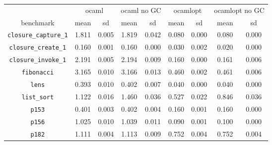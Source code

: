 \documentclass[12pt,a4paper,twoside,openright]{report}
\begin{document}
\begin{table}[h]
\begin{tabular}{| c | c c | c c | c c | c c |}
  \hline
  & \multicolumn{2}{c|}{ocaml}
  & \multicolumn{2}{c|}{ocaml no GC}
  & \multicolumn{2}{c|}{ocamlopt}
  & \multicolumn{2}{c|}{ocamlopt no GC}
  \\
benchmark                     & mean  & sd    & mean  & sd    & mean  & sd    & mean  & sd \\
  \hline
\lstinline!closure_capture_1! & \cellcolor[hsb]{0.3,0.000,1}1.811 & 0.005 & \cellcolor[hsb]{0.0,0.002,1}1.819 & 0.042 & \cellcolor[hsb]{0.3,0.956,1}0.080 & 0.000 & \cellcolor[hsb]{0.3,0.956,1}0.080 & 0.000 \\
\lstinline!closure_create_1!  & \cellcolor[hsb]{0.3,0.000,1}0.160 & 0.001 & \cellcolor[hsb]{0.3,0.001,1}0.160 & 0.000 & \cellcolor[hsb]{0.3,0.810,1}0.030 & 0.002 & \cellcolor[hsb]{0.3,0.875,1}0.020 & 0.000 \\
\lstinline!closure_invoke_1!  & \cellcolor[hsb]{0.3,0.000,1}2.191 & 0.005 & \cellcolor[hsb]{0.0,0.000,1}2.194 & 0.009 & \cellcolor[hsb]{0.3,0.927,1}0.160 & 0.000 & \cellcolor[hsb]{0.3,0.927,1}0.161 & 0.006 \\
\lstinline!fibonacci!         & \cellcolor[hsb]{0.3,0.000,1}3.165 & 0.010 & \cellcolor[hsb]{0.3,0.000,1}3.166 & 0.013 & \cellcolor[hsb]{0.3,0.855,1}0.460 & 0.002 & \cellcolor[hsb]{0.3,0.854,1}0.461 & 0.006 \\
\lstinline!lens!              & \cellcolor[hsb]{0.3,0.000,1}0.393 & 0.010 & \cellcolor[hsb]{0.0,0.012,1}0.402 & 0.007 & \cellcolor[hsb]{0.3,0.898,1}0.040 & 0.000 & \cellcolor[hsb]{0.3,0.898,1}0.040 & 0.000 \\
\lstinline!list_sort!         & \cellcolor[hsb]{0.3,0.000,1}1.122 & 0.016 & \cellcolor[hsb]{0.0,0.151,1}1.460 & 0.036 & \cellcolor[hsb]{0.3,0.530,1}0.527 & 0.022 & \cellcolor[hsb]{0.3,0.246,1}0.846 & 0.036 \\
\lstinline!p153!              & \cellcolor[hsb]{0.3,0.000,1}0.401 & 0.003 & \cellcolor[hsb]{0.0,0.001,1}0.402 & 0.004 & \cellcolor[hsb]{0.3,0.601,1}0.160 & 0.001 & \cellcolor[hsb]{0.3,0.601,1}0.160 & 0.000 \\
\lstinline!p156!              & \cellcolor[hsb]{0.3,0.000,1}1.025 & 0.010 & \cellcolor[hsb]{0.0,0.007,1}1.039 & 0.011 & \cellcolor[hsb]{0.3,0.912,1}0.090 & 0.001 & \cellcolor[hsb]{0.3,0.902,1}0.100 & 0.000 \\
\lstinline!p182!              & \cellcolor[hsb]{0.3,0.000,1}1.111 & 0.004 & \cellcolor[hsb]{0.0,0.000,1}1.113 & 0.009 & \cellcolor[hsb]{0.3,0.323,1}0.752 & 0.004 & \cellcolor[hsb]{0.3,0.323,1}0.752 & 0.004 \\

\end{tabular}
\end{table}
\end{document}
